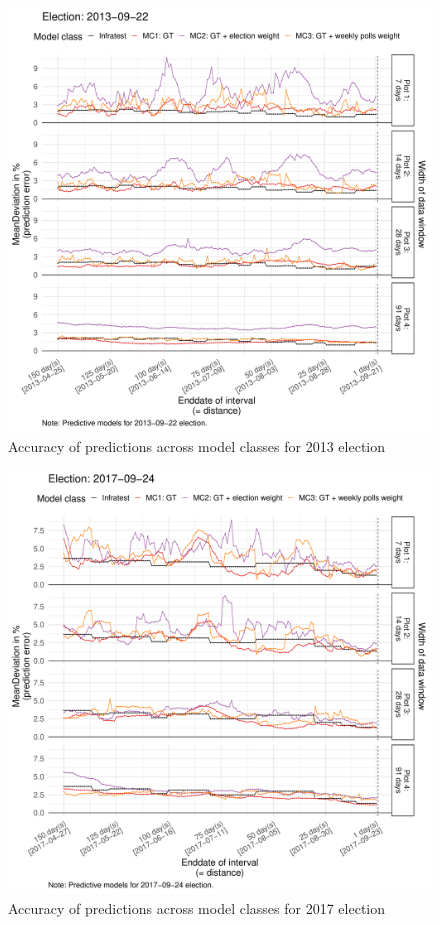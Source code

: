 \documentclass[
  letterpaper,
  DIV=11,
  numbers=noendperiod]{scrartcl}
\begin{document}
\begin{figure}[H]

\caption{\label{fig-A7}Accuracy of predictions across model classes for
2013 election}

{\centering \includegraphics{figures/fig-A7-1.pdf}

}

\end{figure}

\begin{figure}[H]

\caption{\label{fig-A8}Accuracy of predictions across model classes for
2017 election}

{\centering \includegraphics{figures/fig-A8-1.pdf}

}

\end{figure}
\end{document}

